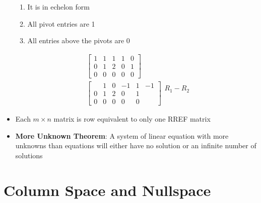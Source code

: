 \begin{itemize}
\begin{enumerate}[label={\alph*)}]
        \item It is in echelon form
        \item All pivot entries are 1
        \item All entries above the pivots are 0
      \end{enumerate}
      \begin{align*}
        &
        \begin{bmatrix}
          1 & 1 & 1 & 1 & 0 \\
          0 & 1 & 2 & 0 & 1 \\
          0 & 0 & 0 & 0 & 0
        \end{bmatrix} \tag{Echelon form} \\
        &
        \begin{bmatrix}
          &
          1 & 0 & -1 & 1 & -1 \\
          0 & 1 & 2 & 0 & 1 \\
          0 & 0 & 0 & 0 & 0
        \end{bmatrix}
        \begin{matrix}
          R_1 - R_2 \\
          \\
          \\
        \end{matrix} \tag{RREF}
      \end{align*}
    \item Each $m \times n$ matrix is row equivalent to only one RREF matrix
    \item \textbf{More Unknown Theorem}: A system of linear equation with more unknowns than equations will either have no solution or an infinite number of solutions
\end{itemize}

\section{Column Space and Nullspace}

